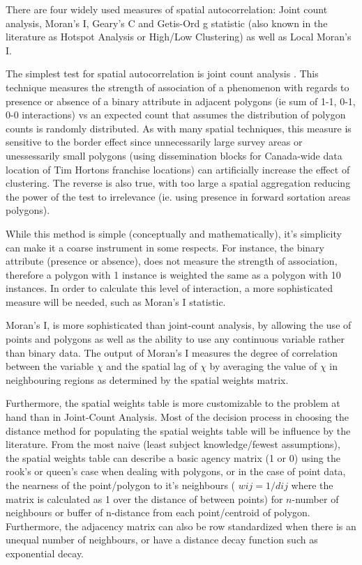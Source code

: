 \documentclass[12pt,letterpaper,notitlepage,onecolumn,final,openbib]{article}
\begin{document}
There are four widely used measures of spatial autocorrelation: Joint count analysis, Moran's I, Geary's C and Getis-Ord g statistic (also known in the literature as Hotspot Analysis or High/Low Clustering) as well as Local Moran's I.  

The simplest test for spatial autocorrelation is joint count analysis \cite{LeeWong2001}. This technique measures the strength of association of a phenomenon with regards to presence or absence of a binary attribute in adjacent polygons (ie sum of 1-1, 0-1, 0-0 interactions) vs an expected count that assumes the distribution of polygon counts is randomly distributed. As with many spatial techniques, this measure is sensitive to the border effect since unnecessarily large survey areas or unessessarily small polygons (using dissemination blocks for Canada-wide data location of Tim Hortons franchise locations) can artificially increase the effect of clustering.  The reverse is also true, with too large a spatial aggregation reducing the power of the test to irrelevance (ie. using presence in forward sortation areas polygons).   

While this method is simple (conceptually and mathematically), it's simplicity can make it a coarse instrument in some respects.  For instance, the binary attribute (presence or absence), does not measure the strength of association, therefore a polygon with 1 instance is weighted the same as a polygon with 10 instances.  In order to calculate this level of interaction, a more sophisticated measure will be needed, such as Moran's I statistic.  

Moran's I, is more sophisticated than joint-count analysis, by allowing the use of points and  polygons as well as the ability to use any continuous variable rather than binary data.  The output of Moran's I measures the degree of correlation between the variable $\chi$ and the spatial lag of $\chi$ by averaging the value of $\chi$ in neighbouring regions as determined by the spatial weights matrix. 

Furthermore, the spatial weights table is more customizable to the problem at hand than in Joint-Count Analysis.  Most of the decision process in choosing the distance method for populating the spatial weights table will be influence by the literature.  From the most naive (least subject knowledge/fewest assumptions), the spatial weights table can describe a basic agency matrix (1 or 0) using the rook's or queen's case when dealing with polygons, or in the case of point data, the nearness of the point/polygon to it's neighbours ( $wij = 1/dij$ where the matrix is calculated as 1 over the distance of between points) for $n$-number of neighbours or buffer of n-distance from each point/centroid of polygon.  Furthermore, the adjacency matrix can also be row standardized when there is an unequal number of neighbours, or have a distance decay function such as exponential decay.   
\end{document}
